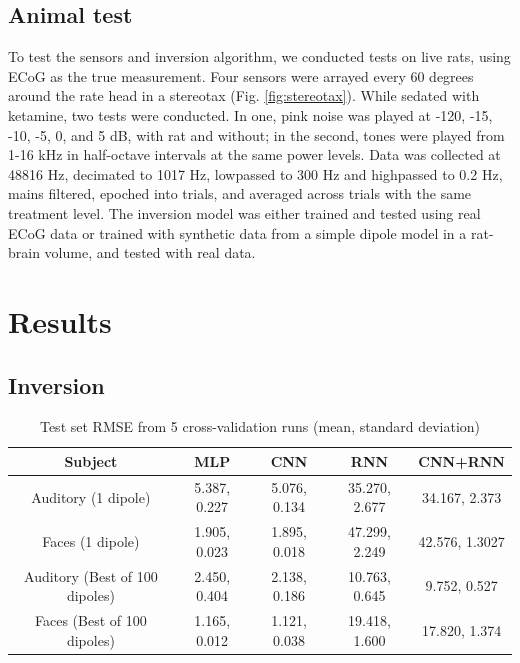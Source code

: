 \documentclass[journal,12pt,onecolumn,draftclsnofoot]{IEEEtran}
\begin{document}
\subsection{Animal test}

To test the sensors and inversion algorithm, we conducted tests on live rats, using ECoG as the true measurement. Four sensors were arrayed every 60 degrees around the rate head in a stereotax (Fig. \ref{fig:stereotax}). While sedated with ketamine, two tests were conducted. In one, pink noise was played at -120, -15, -10, -5, 0, and 5 dB, with rat and without; in the second, tones were played from 1-16 kHz in half-octave intervals at the same power levels. Data was collected at 48816 Hz, decimated to 1017 Hz, lowpassed to 300 Hz and highpassed to 0.2 Hz, mains filtered, epoched into trials, and averaged across trials with the same treatment level. The inversion model was either trained and tested using real ECoG data or trained with synthetic data from a simple dipole model in a rat-brain volume, and tested with real data. 

\section{Results}

\subsection{Inversion}
\begin{table}[h!]
  \centering
  \begin{tabular}{c||c|c|c|c}
    \hline
    Subject & MLP & CNN & RNN & CNN+RNN\\
    \hline
    \hline
    Auditory (1 dipole) & 5.387, 0.227 & 5.076, 0.134 & 35.270, 2.677 & 34.167, 2.373 \\
    \hline
    Faces (1 dipole) &  1.905, 0.023 & 1.895, 0.018 & 47.299, 2.249 & 42.576, 1.3027 \\
    \hline
    Auditory (Best of 100 dipoles) & 2.450, 0.404 & 2.138, 0.186 & 10.763, 0.645 & 9.752, 0.527 \\
    \hline
    Faces (Best of 100 dipoles) &  1.165, 0.012 & 1.121, 0.038 & 19.418, 1.600 & 17.820, 1.374 \\
    \hline
  \end{tabular}
  \caption{Test set RMSE from 5 cross-validation runs (mean, standard deviation)}
  \label{tab:results}
\end{table}
\end{document}
